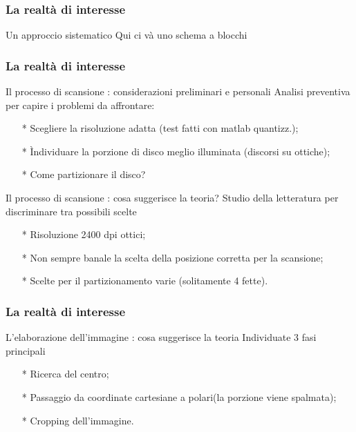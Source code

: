 \begin{frame}
\frametitle{La realtà di interesse}
\begin{block}{Un approccio sistematico}
Qui ci và uno schema a blocchi 
\end{block}
\end{frame}

\begin{frame}
\frametitle{La realtà di interesse}
\begin{block}{Il processo di scansione : considerazioni preliminari e personali}
Analisi preventiva per capire i problemi da affrontare:
\begin{itemize}
\item[*] Scegliere la risoluzione adatta (test fatti con matlab quantizz.);
\item[*] \`Individuare la porzione di disco meglio illuminata (discorsi su ottiche);
\item[*] Come partizionare il disco?
\end{itemize}
\end{block}

\begin{block}{Il processo di scansione : cosa suggerisce la teoria?}
Studio della letteratura per discriminare tra possibili scelte 
\begin{itemize}
\item[*] Risoluzione 2400 dpi ottici;
\item[*] Non sempre banale la scelta della posizione corretta per la scansione;
\item[*] Scelte per il partizionamento varie (solitamente 4 fette).
\end{itemize}
\end{block}
\end{frame}

\begin{frame}
\frametitle{La realtà di interesse}
\begin{block}{L'elaborazione dell'immagine : cosa suggerisce la teoria}
Individuate 3 fasi principali
\begin{itemize}
\item[*] Ricerca del centro;
\item[*] Passaggio da coordinate cartesiane a polari(la porzione viene spalmata);
\item[*] Cropping dell'immagine.
\end{itemize}
\end{block}
\end{frame}


